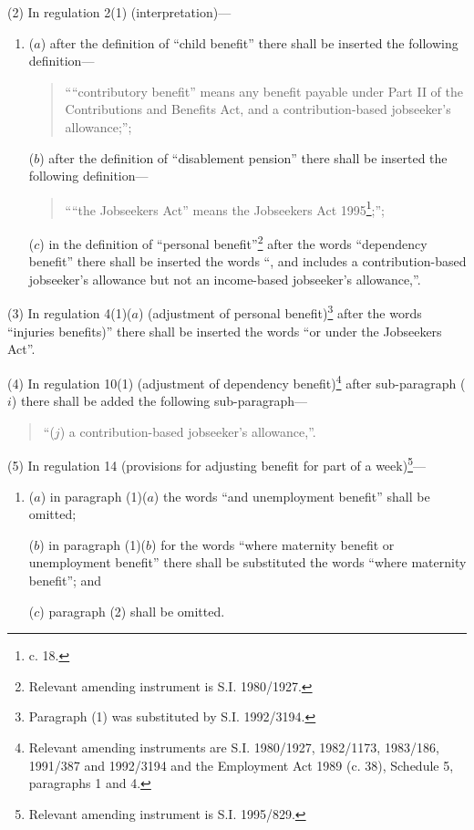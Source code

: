 \documentclass[a4paper]{article}
\begin{document}
(2) In regulation 2(1) (interpretation)—
\begin{enumerate}\item[]
($a$) after the definition of “child benefit” there shall be inserted the following definition—
\begin{quotation}
““contributory benefit” means any benefit payable under Part II of the Contributions and Benefits Act, and a contribution-based jobseeker’s allowance;”;
\end{quotation}

($b$) after the definition of “disablement pension” there shall be inserted the following definition—
\begin{quotation}
““the Jobseekers Act” means the Jobseekers Act 1995\footnote{ c. 18.};”;
\end{quotation}

($c$) in the definition of “personal benefit”\footnote{\frenchspacing Relevant amending instrument is S.I. 1980/1927.} after the words “dependency benefit” there shall be inserted the words “, and includes a contribution-based jobseeker’s allowance but not an income-based jobseeker’s allowance,”.
\end{enumerate}

(3) In regulation 4(1)($a$) (adjustment of personal benefit)\footnote{\frenchspacing Paragraph (1) was substituted by S.I. 1992/3194.} after the words “injuries benefits)” there shall be inserted the words “or under the Jobseekers Act”.

(4) In regulation 10(1) (adjustment of dependency benefit)\footnote{\frenchspacing Relevant amending instruments are S.I. 1980/1927, 1982/1173, 1983/186, 1991/387 and 1992/3194 and the Employment Act 1989 (c. 38), Schedule 5, paragraphs 1 and 4.} after sub-paragraph ($i$) there shall be added the following sub-paragraph—
\begin{quotation}
“($j$) a contribution-based jobseeker’s allowance,”.
\end{quotation}

(5) In regulation 14 (provisions for adjusting benefit for part of a week)\footnote{\frenchspacing Relevant amending instrument is S.I. 1995/829.}—
\begin{enumerate}\item[]
($a$) in paragraph (1)($a$) the words “and unemployment benefit” shall be omitted;

($b$) in paragraph (1)($b$) for the words “where maternity benefit or unemployment benefit” there shall be substituted the words “where maternity benefit”; and

($c$) paragraph (2) shall be omitted.
\end{enumerate}
\end{document}
